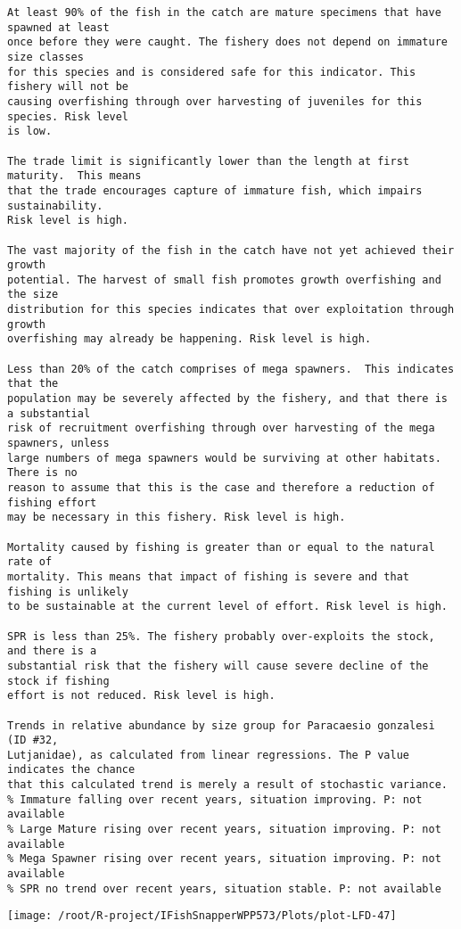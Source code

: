 \documentclass{report}\usepackage[]{graphicx}\usepackage[]{color}
\makeatletter
\def\maxwidth{ %
  \ifdim\Gin@nat@width>\linewidth
    \linewidth
  \else
    \Gin@nat@width
  \fi
}
\newenvironment{kframe}{%
 \def\at@end@of@kframe{}%
 \ifinner\ifhmode%
  \def\at@end@of@kframe{\end{minipage}}%
  \begin{minipage}{\columnwidth}%
 \fi\fi%
 \def\FrameCommand##1{\hskip\@totalleftmargin \hskip-\fboxsep
 \colorbox{shadecolor}{##1}\hskip-\fboxsep
     \hskip-\linewidth \hskip-\@totalleftmargin \hskip\columnwidth}%
 \MakeFramed {\advance\hsize-\width
   \@totalleftmargin\z@ \linewidth\hsize
   \@setminipage}}%
 {\par\unskip\endMakeFramed%
 \at@end@of@kframe}
\newenvironment{knitrout}{}{} %
\makeatother
\begin{document}
\begin{knitrout}
\begin{kframe}
\begin{verbatim}
At least 90% of the fish in the catch are mature specimens that have spawned at least
once before they were caught. The fishery does not depend on immature size classes
for this species and is considered safe for this indicator. This fishery will not be
causing overfishing through over harvesting of juveniles for this species. Risk level
is low.

The trade limit is significantly lower than the length at first maturity.  This means
that the trade encourages capture of immature fish, which impairs sustainability.
Risk level is high.

The vast majority of the fish in the catch have not yet achieved their growth
potential. The harvest of small fish promotes growth overfishing and the size
distribution for this species indicates that over exploitation through growth
overfishing may already be happening. Risk level is high.

Less than 20% of the catch comprises of mega spawners.  This indicates that the
population may be severely affected by the fishery, and that there is a substantial
risk of recruitment overfishing through over harvesting of the mega spawners, unless
large numbers of mega spawners would be surviving at other habitats. There is no
reason to assume that this is the case and therefore a reduction of fishing effort
may be necessary in this fishery. Risk level is high.
 
Mortality caused by fishing is greater than or equal to the natural rate of
mortality. This means that impact of fishing is severe and that fishing is unlikely
to be sustainable at the current level of effort. Risk level is high.
 
SPR is less than 25%. The fishery probably over-exploits the stock, and there is a
substantial risk that the fishery will cause severe decline of the stock if fishing
effort is not reduced. Risk level is high.
 
Trends in relative abundance by size group for Paracaesio gonzalesi (ID #32,
Lutjanidae), as calculated from linear regressions. The P value indicates the chance
that this calculated trend is merely a result of stochastic variance.
% Immature falling over recent years, situation improving. P: not available
% Large Mature rising over recent years, situation improving. P: not available
% Mega Spawner rising over recent years, situation improving. P: not available
% SPR no trend over recent years, situation stable. P: not available
\end{verbatim}
\end{kframe}
\texttt{[image: /root/R-project/IFishSnapperWPP573/Plots/plot-LFD-47]} 


\end{knitrout}
\end{document}
